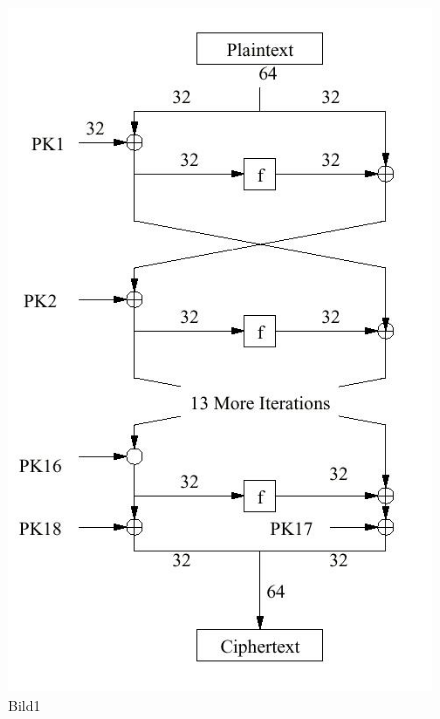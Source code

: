 \documentclass[10pt, a4paper,headsepline]{scrreprt}
\begin{document}
\begin{figure}[htbp]
\begin{minipage}[t]{4cm}
\vspace{0pt}
\centering
\includegraphics[scale=0.3]{blowfish_1.JPG}
\caption{Bild1}
\label{fig:Bild1}
\end{minipage}
\hfill
\begin{minipage}[t]{10cm}


\end{minipage}
\end{figure}
\end{document}
